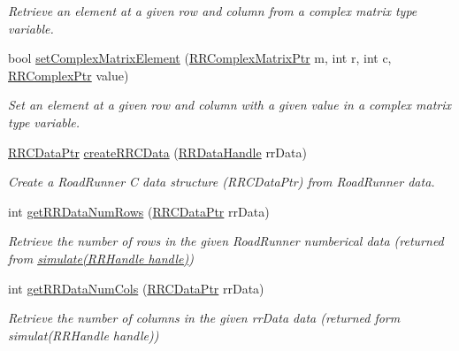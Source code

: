 \begin{DoxyCompactItemize}
\begin{DoxyCompactList}\small\item\em Retrieve an element at a given row and column from a complex matrix type variable. \end{DoxyCompactList}\item 
bool \hyperlink{group__helper_routines_gacbdd712d1e5d677c3849ea2d6dec4001}{set\-Complex\-Matrix\-Element} (\hyperlink{rrc__types_8h_a8cf9e865d8541d100f153800adbb7c3f}{R\-R\-Complex\-Matrix\-Ptr} m, int r, int c, \hyperlink{rrc__types_8h_ada2046d7326c56ae29d8510fbf6622ee}{R\-R\-Complex\-Ptr} value)
\begin{DoxyCompactList}\small\item\em Set an element at a given row and column with a given value in a complex matrix type variable. \end{DoxyCompactList}\item 
\hyperlink{rrc__types_8h_a9da8b124eb9c3c0045f8926c6a420b4a}{R\-R\-C\-Data\-Ptr} \hyperlink{group__helper_routines_gacd923bcda7652f46b813619b0843bcfd}{create\-R\-R\-C\-Data} (\hyperlink{rrc__types_8h_ad0beb6fbdd576789fab9cead01d8b9e9}{R\-R\-Data\-Handle} rr\-Data)
\begin{DoxyCompactList}\small\item\em Create a Road\-Runner C data structure (R\-R\-C\-Data\-Ptr) from Road\-Runner data. \end{DoxyCompactList}\item 
int \hyperlink{group__helper_routines_ga0309b51e111e53ee0131d88c118eb260}{get\-R\-R\-Data\-Num\-Rows} (\hyperlink{rrc__types_8h_a9da8b124eb9c3c0045f8926c6a420b4a}{R\-R\-C\-Data\-Ptr} rr\-Data)
\begin{DoxyCompactList}\small\item\em Retrieve the number of rows in the given Road\-Runner numberical data (returned from \hyperlink{group__simulation_ga7631952c1a80ac25724bf67f7a7ddf7a}{simulate(\-R\-R\-Handle handle)}) \end{DoxyCompactList}\item 
int \hyperlink{group__helper_routines_ga94531f474b344dd40357ceb516aef46c}{get\-R\-R\-Data\-Num\-Cols} (\hyperlink{rrc__types_8h_a9da8b124eb9c3c0045f8926c6a420b4a}{R\-R\-C\-Data\-Ptr} rr\-Data)
\begin{DoxyCompactList}\small\item\em Retrieve the number of columns in the given rr\-Data data (returned form simulat(\-R\-R\-Handle handle)) \end{DoxyCompactList}\item 

\end{DoxyCompactItemize}

